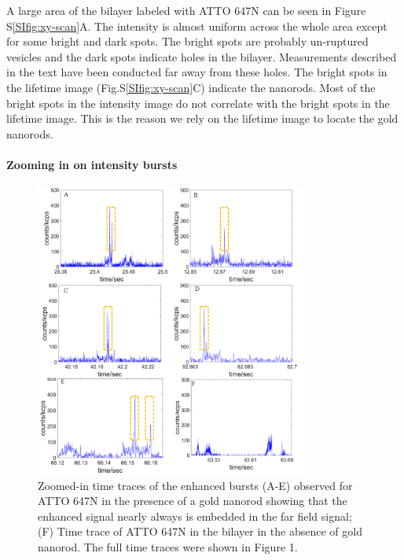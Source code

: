 A large area of the bilayer labeled with ATTO 647N can be seen in Figure S\ref{SIfig:xy-scan}A.
The intensity is almost uniform across the whole area except for some bright and dark spots.
The bright spots are probably un-ruptured vesicles and the dark spots indicate holes in the bilayer.
Measurements described in the text have been conducted far away from these holes.
The bright spots in the lifetime image (Fig.S\ref{SIfig:xy-scan}C) indicate the nanorods.
Most of the bright spots in the intensity image do not correlate with the bright spots in the lifetime image.
This is the reason we rely on the lifetime image to locate the gold nanorods.


\paragraph*{Zooming in on intensity bursts}
\begin{figure}[ht]
  \centering
  \includegraphics[width=0.8\textwidth]{zoomed_traces}
  \makeatletter
  \renewcommand{\fnum@figure}{\figurename~S\thefigure}
  \makeatother{}
  \caption{Zoomed-in time traces of the enhanced bursts (A-E) observed for ATTO 647N in the presence of a gold nanorod showing that the enhanced signal nearly always is embedded in the far field signal; (F) Time trace of ATTO 647N in the bilayer in the absence of gold nanorod.
  The full time traces were shown in Figure 1.}
  \label{SIfig:zoomed-trace}
\end{figure}


